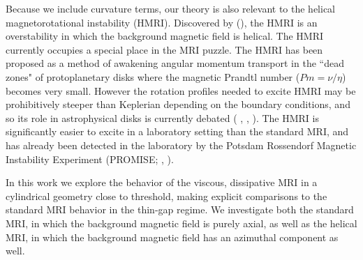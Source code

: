 \documentclass{emulateapj}
\newcommand{\citei}[1]{\citeauthor{#1} \citeyear{#1}}
\begin{document}
Because we include curvature terms, our theory is also relevant to the helical magnetorotational instability (HMRI). Discovered by \citeauthor{Hollerbach:2005tr} (\citeyear{Hollerbach:2005tr}), the HMRI is an overstability in which the background magnetic field is helical. The HMRI currently occupies a special place in the MRI puzzle. The HMRI has been proposed as a method of awakening angular momentum transport in the ``dead zones" of protoplanetary disks where the magnetic Prandtl number ($Pm = \nu/\eta$) becomes very small. However the rotation profiles needed to excite HMRI may be prohibitively steeper than Keplerian depending on the boundary conditions, and so its role in astrophysical disks is currently debated (\citei{Liu:2006}, \citei{Rudiger:2007}, \citei{Kirillov:2013}). The HMRI is significantly easier to excite in a laboratory setting than the standard MRI, and has already been detected in the laboratory by the Potsdam Rossendorf Magnetic Instability Experiment (PROMISE; \citei{Stefani:2006iv}, \citei{Stefani:2009hp}). %

In this work we explore the behavior of the viscous, dissipative MRI in a cylindrical geometry close to threshold, making explicit comparisons to the standard MRI behavior in the thin-gap regime. We investigate both the standard MRI, in which the background magnetic field is purely axial, as well as the helical MRI, in which the background magnetic field has an azimuthal component as well. 
\end{document}
